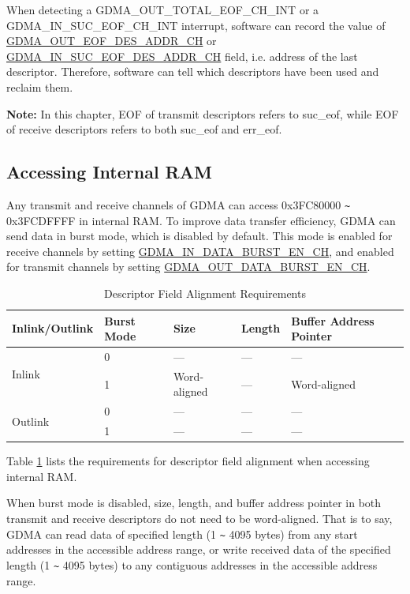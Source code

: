 \documentclass[main\_\_EN.tex]{subfiles}
\begin{document}
When detecting a GDMA\_OUT\_TOTAL\_EOF\_CH\_INT or a GDMA\_IN\_SUC\_EOF\_CH\_INT interrupt, software can record the value of \hyperref[fielddesc:GDMAOUTEOFDESADDRCHN]{GDMA\_OUT\_EOF\_DES\_ADDR\_CH} or \hyperref[fielddesc:GDMAINSUCEOFDESADDRCHN]{GDMA\_IN\_SUC\_EOF\_DES\_ADDR\_CH} field, i.e. address of the last descriptor. Therefore, software can tell which descriptors have been used and reclaim them.

{\bfseries Note: }In this chapter, EOF of transmit descriptors refers to suc\_eof, while EOF of receive descriptors refers to both suc\_eof and err\_eof.

\subsection{Accessing Internal RAM}\label{sec:dma-access-inter-ram}

Any transmit and receive channels of GDMA can access 0x3FC80000 \verb+~+ 0x3FCDFFFF in internal RAM. To improve data transfer efficiency, GDMA can send data in burst mode, which is disabled by default. This mode is enabled for receive channels by setting \hyperref[fielddesc:GDMAINDATABURSTENCHN]{GDMA\_IN\_DATA\_BURST\_EN\_CH}, and enabled for transmit channels by setting \hyperref[fielddesc:GDMAOUTDATABURSTENCHN]{GDMA\_OUT\_DATA\_BURST\_EN\_CH}. 

\begin{longtable}[c]{ | l | l | l | l | l | }
    \caption{Descriptor Field Alignment Requirements}
    \label{tab:gdma-inter-desc-param-align}
    \\\hline
    \rowcolor{lightgray}
    Inlink/Outlink & Burst Mode & Size & Length & Buffer Address Pointer \\\hline

    \multirow{2}{*}{Inlink}  & 0  & --- & ---  & --- \\\cline{2-5} 
     & 1 & Word-aligned   & ---  & Word-aligned \\\hline
    \multirow{2}{*}{Outlink} & 0  & --- & ---  & --- \\\cline{2-5} 
     & 1 & --- & ---  & --- \\\hline
\end{longtable}

Table \ref{tab:gdma-inter-desc-param-align} lists the requirements for descriptor field alignment when accessing internal RAM.

When burst mode is disabled, size, length, and buffer address pointer in both transmit and receive descriptors do not need to be word-aligned. That is to say, GDMA can read data of specified length (1 \verb+~+ 4095 bytes) from any start addresses in the accessible address range, or write received data of the specified length (1 \verb+~+ 4095 bytes) to any contiguous addresses in the accessible address range. 
\end{document}
